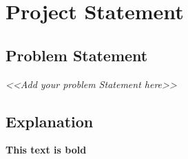 \chapter{Project Statement}

\section{Problem Statement}
\emph{<<Add your problem Statement here>>}

\section{Explanation}


\textbf{This text is bold}


